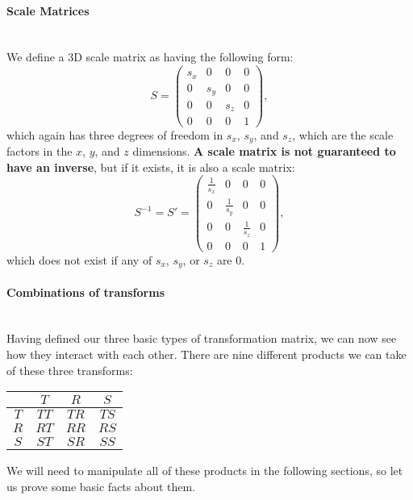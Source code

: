 \documentclass{article}
\begin{document}
\paragraph{Scale Matrices}\mbox{}\\
We define a 3D scale matrix as having the following form:
\begin{equation}
S = \begin{pmatrix}
s_{x} & 0 & 0 & 0\\
0 & s_y & 0 & 0\\
0 & 0 & s_z & 0\\
0 & 0 & 0 & 1
\end{pmatrix},
\end{equation}
which again has three degrees of freedom in $s_x$, $s_y$, and $s_z$, which are the scale factors in the $x$, $y$, and $z$ dimensions.
\textbf{A scale matrix is not guaranteed to have an inverse}, but if it exists, it is also a scale matrix:
\begin{equation}
S^{-1} = S' = \begin{pmatrix}
\frac{1}{s_x} & 0 & 0 & 0\\
0 & \frac{1}{s_y} & 0 & 0\\
0 & 0 & \frac{1}{s_z} & 0\\
0 & 0 & 0 & 1
\end{pmatrix},
\end{equation}
which does not exist if any of $s_x$, $s_y$, or $s_z$ are 0.

\paragraph{Combinations of transforms}\mbox{}\\
Having defined our three basic types of transformation matrix, we can now see how they interact with each other. There are nine different products we can take of these three transforms:
\begin{center}
\begin{tabular}{|c|ccc|}
\hline
& $T$ & $R$ & $S$ \\
\hline
$T$ & $TT$ & $TR$ & $TS$ \\
$R$ & $RT$ & $RR$ & $RS$ \\
$S$ & $ST$ & $SR$ & $SS$ \\
\hline
\end{tabular}
\end{center}
We will need to manipulate all of these products in the following sections, so let us prove some basic facts about them.\\
\end{document}
